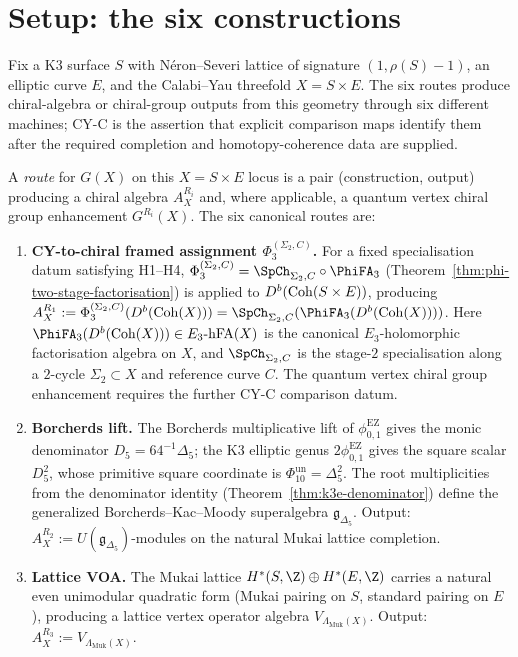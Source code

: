 \section{Setup: the six constructions}
\label{sec:cy-c-six-setup}

Fix a K3 surface $S$ with N\'eron--Severi lattice of signature $(1, \rho(S) - 1)$, an elliptic curve $E$, and the Calabi--Yau threefold $X = S \times E$. The six routes produce chiral-algebra or chiral-group outputs from this geometry through six different machines; CY-C is the assertion that explicit comparison maps identify them after the required completion and homotopy-coherence data are supplied.

\begin{definition}
\label{def:cy-c-six-routes}
A \emph{route} for $G(X)$ on this $X=S\times E$ locus is a pair
(construction, output) producing a chiral algebra $A^{R_i}_X$ and, where
applicable, a quantum vertex chiral group enhancement $G^{R_i}(X)$.
The six canonical routes are:
\begin{enumerate}[label=\textbf{R\arabic*.}]
 \item \textbf{CY-to-chiral framed assignment $\Phi_3^{(\Sigma_2,C)}$.} For a fixed specialisation datum satisfying H1--H4,
		 $\Phi_3^{(\Sigma_2, C)} = \SpCh_{\Sigma_2, C} \circ \PhiFA_3$ (Theorem~\ref{thm:phi-two-stage-factorisation}) is applied to $D^b(\mathrm{Coh}(S \times E))$, producing $A_X^{R_1} := \Phi_3^{(\Sigma_2,C)}(D^b(\Coh(X))) = \SpCh_{\Sigma_2, C}(\PhiFA_3(D^b(\Coh(X))))$. Here $\PhiFA_3(D^b(\Coh(X))) \in \EdHolFA(X)$ is the canonical $E_3$-holomorphic factorisation algebra on $X$, and $\SpCh_{\Sigma_2, C}$ is the stage-$2$ specialisation along a $2$-cycle $\Sigma_2 \subset X$ and reference curve $C$. The quantum vertex chiral group enhancement requires the further CY-C comparison datum.
 \item \textbf{Borcherds lift.} The Borcherds multiplicative lift of \(\phi_{0,1}^{\mathrm{EZ}}\) gives the monic denominator \(D_5=64^{-1}\Delta_5\); the K3 elliptic genus \(2\phi_{0,1}^{\mathrm{EZ}}\) gives the square scalar \(D_5^2\), whose primitive square coordinate is \(\Phi_{10}^{\mathrm{un}}=\Delta_5^2\). The root multiplicities from the denominator identity (Theorem~\ref{thm:k3e-denominator}) define the generalized Borcherds--Kac--Moody superalgebra $\mathfrak{g}_{\Delta_5}$. Output: $A_X^{R_2} := U(\mathfrak{g}_{\Delta_5})$-modules on the natural Mukai lattice completion.
 \item \textbf{Lattice VOA.} The Mukai lattice $H^*(S, \Z) \oplus H^*(E, \Z)$ carries a natural even unimodular quadratic form (Mukai pairing on $S$, standard pairing on $E$), producing a lattice vertex operator algebra $V_{\Lambda_{\mathrm{Muk}}(X)}$. Output: $A_X^{R_3} := V_{\Lambda_{\mathrm{Muk}}(X)}$.

\end{enumerate}
\end{definition}
